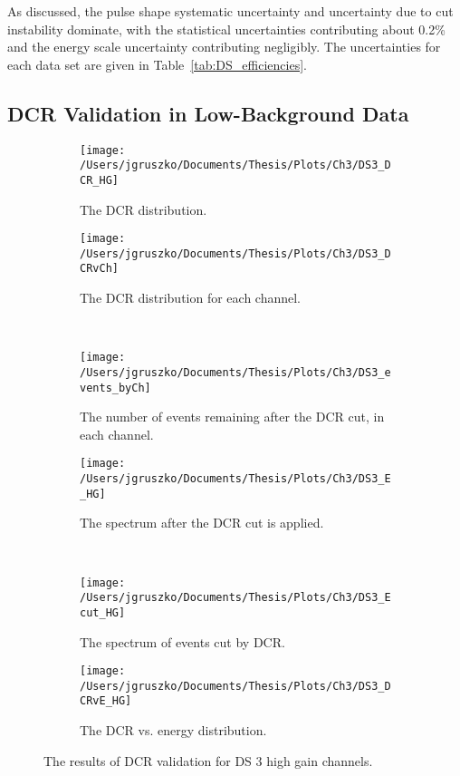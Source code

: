 As discussed, the pulse shape systematic uncertainty and uncertainty due to cut instability dominate, with the statistical uncertainties contributing about 0.2\% and the energy scale uncertainty contributing negligibly. The uncertainties for each data set are given in Table~\ref{tab:DS_efficiencies}. 

\subsection{DCR Validation in Low-Background Data}

\begin{figure*}[]
 \centering
 \begin{subfigure}[t]{0.45\textwidth}
   \texttt{[image: /Users/jgruszko/Documents/Thesis/Plots/Ch3/DS3\_DCR\_HG]}
    \caption{The DCR distribution.}
    \label{fig:DS3_DCR}
  \end{subfigure}
\hfill
 \begin{subfigure}[t]{0.45\textwidth}
   \texttt{[image: /Users/jgruszko/Documents/Thesis/Plots/Ch3/DS3\_DCRvCh]}
    \caption{The DCR distribution for each channel.}
    \label{fig:DS3_DCRvCh}
  \end{subfigure}
   ~
 \begin{subfigure}[t]{0.45\textwidth}
   \texttt{[image: /Users/jgruszko/Documents/Thesis/Plots/Ch3/DS3\_events\_byCh]}
    \caption{The number of events remaining after the DCR cut, in each channel.}
    \label{fig:events_byCh}
  \end{subfigure}
\hfill
  \begin{subfigure}[t]{0.45\textwidth}
   \texttt{[image: /Users/jgruszko/Documents/Thesis/Plots/Ch3/DS3\_E\_HG]}
    \caption{The spectrum after the DCR cut is applied.}
    \label{fig:DS3_E_HG}
  \end{subfigure}
   ~
  \begin{subfigure}[t]{0.45\textwidth}
   \texttt{[image: /Users/jgruszko/Documents/Thesis/Plots/Ch3/DS3\_Ecut\_HG]}
    \caption{The spectrum of events cut by DCR.}
    \label{fig:DS3_Ecut_HG}
  \end{subfigure}
\hfill
     \begin{subfigure}[t]{0.45\textwidth}
   \texttt{[image: /Users/jgruszko/Documents/Thesis/Plots/Ch3/DS3\_DCRvE\_HG]}
    \caption{The DCR vs. energy distribution.}
    \label{fig:DS3_DCRvE_HG}
  \end{subfigure}
  \caption{The results of DCR validation for DS 3 high gain channels.}
  \end{figure*}
  
